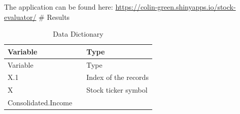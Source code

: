 \documentclass[11pt,]{article}
\begin{document}
The application can be found here:
\url{https://colin-green.shinyapps.io/stock-evaluator/} \# Results

\begin{longtable}[]{@{}lll@{}}
\caption{Data Dictionary}\tabularnewline
\toprule
\begin{minipage}[b]{0.19\columnwidth}\raggedright
Variable\strut
\end{minipage} & \begin{minipage}[b]{0.10\columnwidth}\raggedright
\strut
\end{minipage} & \begin{minipage}[b]{0.62\columnwidth}\raggedright
Type\strut
\end{minipage}\tabularnewline
\midrule
\endfirsthead
\toprule
\begin{minipage}[b]{0.19\columnwidth}\raggedright
Variable\strut
\end{minipage} & \begin{minipage}[b]{0.10\columnwidth}\raggedright
\strut
\end{minipage} & \begin{minipage}[b]{0.62\columnwidth}\raggedright
Type\strut
\end{minipage}\tabularnewline
\midrule
\endhead
\begin{minipage}[t]{0.19\columnwidth}\raggedright
X.1\strut
\end{minipage} & \begin{minipage}[t]{0.10\columnwidth}\raggedright
\strut
\end{minipage} & \begin{minipage}[t]{0.62\columnwidth}\raggedright
Index of the records\strut
\end{minipage}\tabularnewline
\begin{minipage}[t]{0.19\columnwidth}\raggedright
X\strut
\end{minipage} & \begin{minipage}[t]{0.10\columnwidth}\raggedright
\strut
\end{minipage} & \begin{minipage}[t]{0.62\columnwidth}\raggedright
Stock ticker symbol\strut
\end{minipage}\tabularnewline
\begin{minipage}[t]{0.19\columnwidth}\raggedright
Consolidated.Income\strut
\end{minipage} & \begin{minipage}[t]{0.10\columnwidth}\raggedright
\strut
\end{minipage} & \begin{minipage}[t]{0.62\columnwidth}\raggedright

\end{minipage}
\end{longtable}
\end{document}
